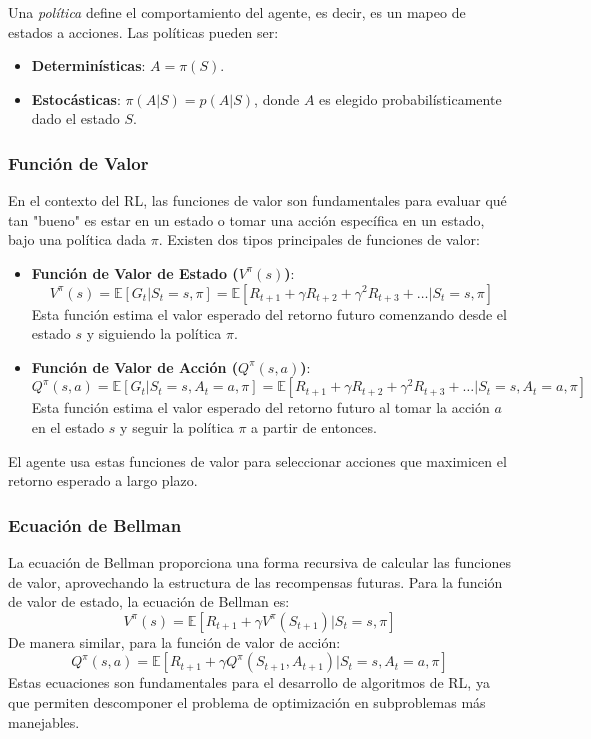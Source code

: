\documentclass[a4paper,12pt]{report}
\begin{document}
Una \textit{política} define el comportamiento del agente, es decir, es un mapeo de estados a acciones. Las políticas pueden ser:
\begin{itemize}
    \item \textbf{Determinísticas}: \(A = \pi(S)\).
    \item \textbf{Estocásticas}: \(\pi(A|S) = p(A|S)\), donde \(A\) es elegido probabilísticamente dado el estado \(S\).
\end{itemize}

\subsubsection{Función de Valor}

En el contexto del RL, las funciones de valor son fundamentales para evaluar qué tan "bueno" es estar en un estado o tomar una acción específica en un estado, bajo una política dada \(\pi\). Existen dos tipos principales de funciones de valor:

\begin{itemize}
    \item \textbf{Función de Valor de Estado (\(V^{\pi}(s)\))}: 
    \[
    V^{\pi}(s) = \mathbb{E}[G_t | S_t = s, \pi] = \mathbb{E}[R_{t+1} + \gamma R_{t+2} + \gamma^2 R_{t+3} + \ldots | S_t = s, \pi]
    \]
    Esta función estima el valor esperado del retorno futuro comenzando desde el estado \(s\) y siguiendo la política \(\pi\).
    
    \item \textbf{Función de Valor de Acción (\(Q^{\pi}(s, a)\))}: 
    \[
    Q^{\pi}(s, a) = \mathbb{E}[G_t | S_t = s, A_t = a, \pi] = \mathbb{E}[R_{t+1} + \gamma R_{t+2} + \gamma^2 R_{t+3} + \ldots | S_t = s, A_t = a, \pi]
    \]
    Esta función estima el valor esperado del retorno futuro al tomar la acción \(a\) en el estado \(s\) y seguir la política \(\pi\) a partir de entonces.
\end{itemize}

El agente usa estas funciones de valor para seleccionar acciones que maximicen el retorno esperado a largo plazo.

\subsubsection{Ecuación de Bellman}

La ecuación de Bellman proporciona una forma recursiva de calcular las funciones de valor, aprovechando la estructura de las recompensas futuras. Para la función de valor de estado, la ecuación de Bellman es:
\[
V^{\pi}(s) = \mathbb{E}[R_{t+1} + \gamma V^{\pi}(S_{t+1}) | S_t = s, \pi]
\]
De manera similar, para la función de valor de acción:
\[
Q^{\pi}(s, a) = \mathbb{E}[R_{t+1} + \gamma Q^{\pi}(S_{t+1}, A_{t+1}) | S_t = s, A_t = a, \pi]
\]
Estas ecuaciones son fundamentales para el desarrollo de algoritmos de RL, ya que permiten descomponer el problema de optimización en subproblemas más manejables.
\end{document}
